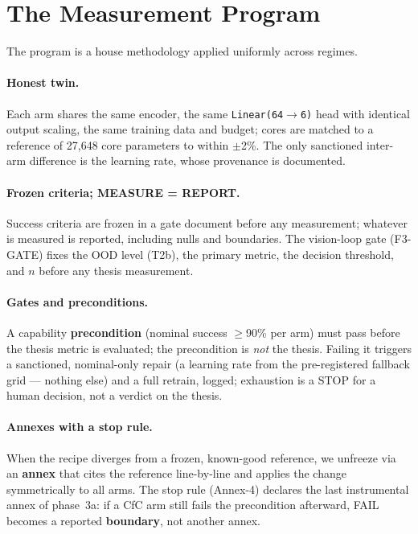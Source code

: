 \documentclass[11pt]{article}
\begin{document}
\section{The Measurement Program}\label{sec:program}
The program is a house methodology applied uniformly across regimes.

\paragraph{Honest twin.} Each arm shares the same encoder, the same \texttt{Linear(64$\to$6)} head with identical output scaling, the same training data and budget; cores are matched to a reference of 27{,}648 core parameters to within $\pm$2\%. The only sanctioned inter-arm difference is the learning rate, whose provenance is documented.

\paragraph{Frozen criteria; MEASURE = REPORT.} Success criteria are frozen in a gate document before any measurement; whatever is measured is reported, including nulls and boundaries. The vision-loop gate (F3-GATE) fixes the OOD level (T2b), the primary metric, the decision threshold, and $n$ before any thesis measurement.

\paragraph{Gates and preconditions.} A capability \textbf{precondition} (nominal success $\geq$90\% per arm) must pass before the thesis metric is evaluated; the precondition is \emph{not} the thesis. Failing it triggers a sanctioned, nominal-only repair (a learning rate from the pre-registered fallback grid --- nothing else) and a full retrain, logged; exhaustion is a STOP for a human decision, not a verdict on the thesis.

\paragraph{Annexes with a stop rule.} When the recipe diverges from a frozen, known-good reference, we unfreeze via an \textbf{annex} that cites the reference line-by-line and applies the change symmetrically to all arms. The stop rule (Annex-4) declares the last instrumental annex of phase~3a: if a CfC arm still fails the precondition afterward, FAIL becomes a reported \textbf{boundary}, not another annex.
\end{document}
